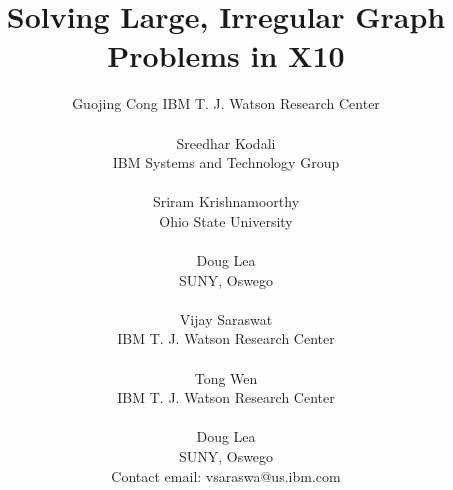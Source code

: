 \documentclass[10pt]{ieee}
\numberwithin{equation}{section}
\def\Xten{{\sf X10}}
\begin{document}
\title{Solving Large, Irregular Graph Problems in \Xten}

\author{
Guojing Cong
IBM T. J. Watson Research Center\\
\vspace*{-2ex} \\
Sreedhar Kodali\\
IBM Systems and Technology Group\\
\vspace*{-2ex} \\
Sriram Krishnamoorthy \\
Ohio State University\\
\vspace*{-3ex} \\
Doug Lea\\
SUNY, Oswego\\
\vspace*{-3ex} \\
Vijay Saraswat\\
IBM T. J. Watson Research Center\\
\vspace*{-3ex} \\
Tong Wen\\
IBM T. J. Watson Research Center\\
\vspace*{-3ex} \\
Doug Lea\\
SUNY, Oswego\\
Contact email: vsaraswa@us.ibm.com\\ 
}

\date{}

\maketitle
\thispagestyle{empty}




%

%



{\footnotesize


}
\end{document}
